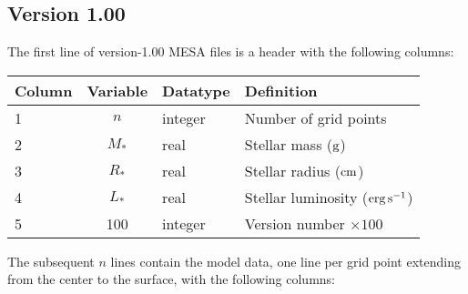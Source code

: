 \documentclass{article}
\newcommand{\Rstar}{\ensuremath{R_{\ast}}}
\newcommand{\Mstar}{\ensuremath{M_{\ast}}}
\newcommand{\Lstar}{\ensuremath{L_{\ast}}}
\newcommand{\cm}{\ensuremath{{\rm cm}}}
\newcommand{\gram}{\ensuremath{{\rm g}}}
\newcommand{\second}{\ensuremath{{\rm s}}}
\newcommand{\erg}{\ensuremath{{\rm erg}}}
\begin{document}
\newpage

\subsection*{Version 1.00}

The first line of version-1.00 MESA files is a header with the following
columns:

\begin{table}[h!]
\begin{tabular}{|l|c|l|l|} \hline
Column & Variable & Datatype & Definition \\ \hline
1      & $n$ & integer & Number of grid points \\
2      & \Mstar & real & Stellar mass ($\gram$) \\
3      & \Rstar & real & Stellar radius ($\cm$) \\
4      & \Lstar & real & Stellar luminosity ($\erg\,\second^{-1}$) \\
5      & 100    & integer & Version number $\times 100$ \\ \hline
\end{tabular}
\end{table}

The subsequent $n$ lines contain the model data, one line per
grid point extending from the center to the surface, with the following columns:
\end{document}
